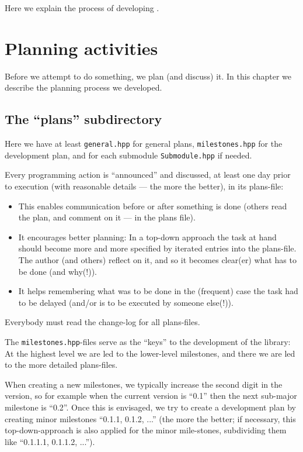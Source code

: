 \documentclass{book}
\begin{document}
Here we explain the process of developing \OKplatform.


\chapter{Planning activities}
\label{cha:Planningactivities}

Before we attempt to do something, we plan (and discuss) it. In this chapter we describe the planning process we developed.


\section{The ``plans'' subdirectory}
\label{sec:planssubdirectory}

Here we have at least \texttt{general.hpp} for general plans, \texttt{milestones.hpp} for the development plan, and for each submodule \texttt{Submodule.hpp} if needed.

Every programming action is ``announced'' and discussed, at least one day prior to execution (with reasonable details --- the more the better), in its plans-file:
\begin{itemize}
\item This enables communication before or after something is done (others read the plan, and comment on it --- in the plans file).
\item It encourages better planning: In a top-down approach the task at hand should become more and more specified by iterated entries into the plans-file. The author (and others) reflect on it, and so it becomes clear(er) what has to be done (and why(!)).
\item It helps remembering what was to be done in the (frequent) case the task had to be delayed (and/or is to be executed by someone else(!)).
\end{itemize}

Everybody must read the change-log for all plans-files.

The \texttt{milestones.hpp}-files serve as the ``keys'' to the development of the library: At the highest level we are led to the lower-level milestones, and there we are led to the more detailed plans-files.

When creating a new milestones, we typically increase the second digit in the version, so for example when the current version is ``0.1'' then the next sub-major milestone is ``0.2''. Once this is envisaged, we try to create a development plan by creating minor milestones ``0.1.1, 0.1.2, ...'' (the more the better; if necessary, this top-down-approach is also applied for the minor mile-stones, subdividing them like ``0.1.1.1, 0.1.1.2, ...'').
\end{document}

